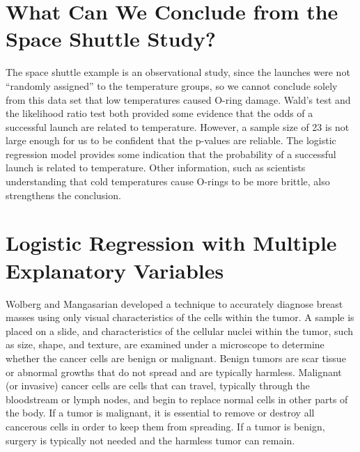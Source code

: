 \documentclass[
]{report}
\begin{document}
\hypertarget{what-can-we-conclude-from-the-space-shuttle-study-1}{%
\section{\texorpdfstring{\textbf{What Can We Conclude from the Space Shuttle Study?}}{What Can We Conclude from the Space Shuttle Study?}}\label{what-can-we-conclude-from-the-space-shuttle-study-1}}

The space shuttle example is an observational study, since the launches were not ``randomly assigned'' to the temperature groups, so we cannot conclude solely from this data set that low temperatures caused O-ring damage. Wald's test and the likelihood ratio test both provided some evidence that the odds of a successful launch are related to temperature. However, a sample size of 23 is not large enough for us to be confident that the p-values are reliable. The logistic regression model provides some indication that the probability of a successful launch is related to temperature. Other information, such as scientists understanding that cold temperatures cause O-rings to be more brittle, also strengthens the conclusion.

\hypertarget{logistic-regression-with-multiple-explanatory-variables-1}{%
\section{\texorpdfstring{\textbf{Logistic Regression with Multiple Explanatory Variables}}{Logistic Regression with Multiple Explanatory Variables}}\label{logistic-regression-with-multiple-explanatory-variables-1}}

Wolberg and Mangasarian developed a technique to accurately diagnose breast masses using only visual characteristics of the cells within the tumor. A sample is placed on a slide, and characteristics of the cellular nuclei within the tumor, such as size, shape, and texture, are examined under a microscope to determine whether the cancer cells are benign or malignant. Benign tumors are scar tissue or abnormal growths that do not spread and are typically harmless. Malignant (or invasive) cancer cells are cells that can travel, typically through the bloodstream or lymph nodes, and begin to replace normal cells in other parts of the body. If a tumor is malignant, it is essential to remove or destroy all cancerous cells in order to keep them from spreading. If a tumor is benign, surgery is typically not needed and the harmless tumor can remain.
\end{document}
